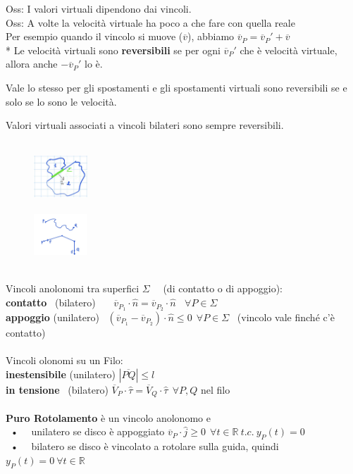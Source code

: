 \documentclass{article}
\theoremstyle{unnumbered}
\theoremstyle{unnumbered1}
\begin{document}
%
Oss: I valori virtuali dipendono dai vincoli.\\
Oss: A volte la velocità virtuale ha poco a che fare con quella reale \\
\phantom{Oss: }Per esempio quando il vincolo si muove ($\overline{v}$), abbiamo $\overline{v}_P = \overline{v}_P' + \overline{v}$  \ \\*
%
%
%
Le velocità virtuali sono \textbf{reversibili} se per ogni $\overline{v}_P'$ che è velocità virtuale, allora anche $-\overline{v}_P'$ lo è.

Vale lo stesso per gli spostamenti e gli spostamenti virtuali sono reversibili se e solo se lo sono le velocità.

Valori virtuali associati a vincoli bilateri sono sempre reversibili. \ \ \ \ \ \ \ \ \ \ \ \ \ \ \ \ \ \ \ \ \ \ \ \ \ \ \ \ \ \ \ \ \ \ \ 
%
%
%
%
\begin{figure}
\includegraphics[width=0.18\textwidth]{Contatto.jpeg} \\ \\
\includegraphics[width=0.18\textwidth]{Filo.jpeg}
\end{figure} \\
%
Vincoli anolonomi tra superfici $\Sigma$ \ \ (di contatto o di appoggio):\\
\textbf{contatto} \ (bilatero) \ \ \ $\overline{v}_{P_1}\cdot\hat{n} =\overline{v}_{P_2}\cdot\hat{n} \ \ \ \ \forall P \in \Sigma$ \\
\textbf{appoggio} (unilatero) \ $(\overline{v}_{P_1} -\overline{v}_{P_2})\cdot\hat{n} \leq 0 \ \ \forall P \in \Sigma$ \ (vincolo vale finché c'è contatto) \linebreak \\ \\
%
%
Vincoli olonomi su un Filo:\\
\textbf{inestensibile} (unilatero) $|\overline{PQ}| \leq l$\\
\textbf{in tensione} \ (bilatero) $\overline{V}_P\cdot \hat{\tau} = \overline{V}_Q\cdot\hat{\tau} \ \ \forall P,Q$ nel filo \\ \\
%
%
%
\textbf{Puro Rotolamento} è un vincolo anolonomo e\\
\ • \ \ unilatero se disco è appoggiato $\overline{v}_P  \cdot \hat{j} \geq 0 \ \ \forall t \in \mathbb{R} \ t.c. \ y_P(t)=0$\\
\ • \ \ bilatero se disco è vincolato a rotolare sulla guida, quindi \ \ $y_P(t)=0 \ \forall t \in \mathbb{R}$
\end{document}
